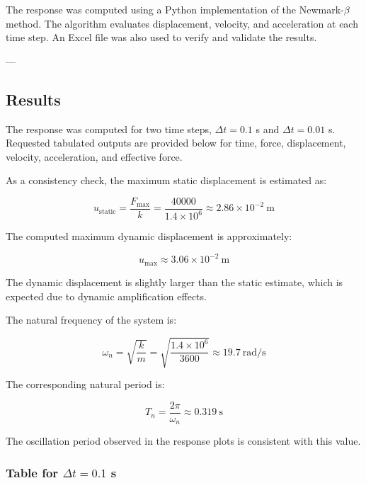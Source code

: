The response was computed using a Python implementation of the Newmark-$\beta$ method. 
The algorithm evaluates displacement, velocity, and acceleration at each time step. 
An Excel file was also used to verify and validate the results.

---

\subsection{Results}

The response was computed for two time steps, $\Delta t = 0.1$ s and $\Delta t = 0.01$ s.
Requested tabulated outputs are provided below for time, force, displacement, velocity, acceleration, and effective force.

As a consistency check, the maximum static displacement is estimated as:

\begin{equation}
u_{\text{static}} = \frac{F_{\max}}{k}
= \frac{40000}{1.4 \times 10^6}
\approx 2.86 \times 10^{-2} \ \text{m}
\end{equation}

The computed maximum dynamic displacement is approximately:

\begin{equation}
u_{\max} \approx 3.06 \times 10^{-2} \ \text{m}
\end{equation}

The dynamic displacement is slightly larger than the static estimate, which is expected due to dynamic amplification effects.

The natural frequency of the system is:

\begin{equation}
\omega_n = \sqrt{\frac{k}{m}} = \sqrt{\frac{1.4 \times 10^6}{3600}} \approx 19.7 \ \text{rad/s}
\end{equation}

The corresponding natural period is:

\begin{equation}
T_n = \frac{2\pi}{\omega_n} \approx 0.319 \ \text{s}
\end{equation}

The oscillation period observed in the response plots is consistent with this value.

\subsubsection{Table for $\Delta t = 0.1$ s}

